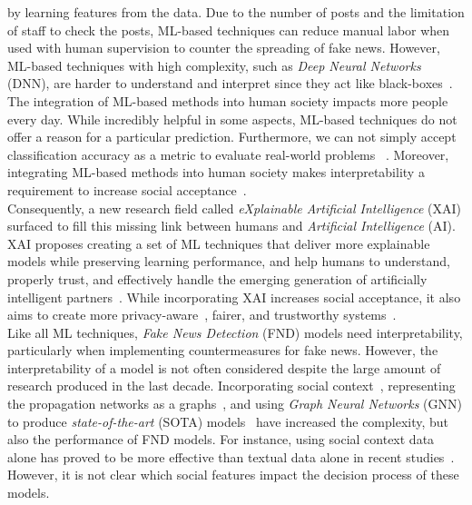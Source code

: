 by learning features from the data. Due to the number of posts and the limitation of staff to check the posts, ML-based techniques can reduce manual labor when used with human supervision to counter the spreading of fake news. However, ML-based techniques with high complexity, such as \emph{Deep Neural Networks} (DNN), are harder to understand and interpret since they act like black-boxes~\parencite{CanWeOpenTheBlackBoxOfAI_Castelvecchi}.\\
The integration of ML-based methods into human society impacts more people every day. While incredibly helpful in some aspects,
ML-based techniques do not offer a reason for a particular prediction. Furthermore, we can not simply accept classification accuracy
as a metric to evaluate real-world problems ~\parencite{TowardsARigorousScienceML_Velez}. Moreover, integrating ML-based methods into human society
makes interpretability a requirement to increase social acceptance~\parencite{InterpretableMachineLearning_Molnar}.\\
Consequently, a new research field called \emph{eXplainable Artificial Intelligence} (XAI) surfaced to fill this missing link between humans and
\emph{Artificial Intelligence} (AI). XAI proposes creating a set of ML techniques that deliver more explainable models while preserving learning performance, and help humans to understand, properly trust, and effectively handle the emerging generation of artificially intelligent partners~\parencite{XAI_Gunning}. While incorporating XAI increases social acceptance, it also aims to create more privacy-aware~\parencite{SlaveToTheAlgorithm_EdwardsVeale}, fairer, and trustworthy systems~\parencite{TheMythosOfModelInterpretability_Lipton}.\\
Like all ML techniques, \emph{Fake News Detection} (FND) models need interpretability, particularly when implementing countermeasures for fake
news. However, the interpretability of a model is not often considered despite the large amount of research produced in the last decade.
Incorporating social context~\parencite{FakeNewsNet_Shu}, representing the propagation networks as a graphs~\parencite{UPFD_Dataset_Shu},
and using \emph{Graph Neural Networks} (GNN) to produce \emph{state-of-the-art} (SOTA) models~\parencite{FakeNewsDetectionUsingGeometricDeepLearning_Monti} have increased the complexity, but also the performance of FND models.
For instance, using social context data alone has proved to be more effective than textual data alone in recent studies~\parencite{UPFD_Dataset_Shu}. However, it is not clear which social features impact the decision process of these models.\\
